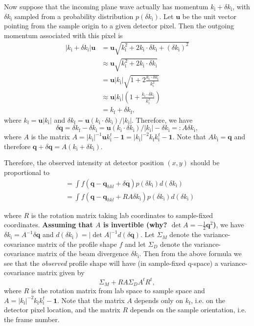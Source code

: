 \documentclass[11pt,a4paper]{article}
\def\v#1{\bm{{#1}}}
\def\si{\text{i}}
\def\sf{\text{f}}
\def\q{{\v{q}}}
\def\bu{\v{u}}
\begin{document}
Now suppose that the incoming plane wave actually has momentum $k_\si + \delta k_\si$, with $\delta k_\si$ sampled from a probability distribution $p(\delta k_\si)$. Let $\bu$ be the unit vector pointing from the sample origin to a given detector pixel. Then the outgoing momentum associated with this pixel is
\begin{align}
  |k_\si + \delta k_\si| \bu &= \bu \sqrt{k_\si^2  + 2 k_\si \cdot \delta k_\si + (\delta k_\si)^2 } \\
  &\approx \bu\sqrt{k_\si^2  + 2 k_\si \cdot \delta k_\si} \\
  &= \bu|k_\si|\sqrt{1+ 2\frac{k_\si \cdot \delta k_\si}{k_\si^2}} \\
  &\approx \bu|k_\si| \left(1 +  \frac{k_\si \cdot \delta k_\si}{k_\si^2}\right) \\
  &= k_\sf + \delta k_\sf,
\end{align}
where $k_\sf = \bu|k_\si|$ and $\delta k_\sf = \bu(k_\si \cdot \delta k_\si) / |k_\si|$. Therefore, we have
\begin{equation}
  \delta\q
  = \delta k_\sf - \delta k_\si = \bu(k_\si \cdot \delta k_\si) / |k_\si| - \delta k_\si
  =: A \delta k_\si,
\end{equation}
where $A$ is the matrix $A = |k_\si|^{-1} \bu k_\si^t - \v1 = |k_\si|^{-2} k_\sf k_\si^t - \v1$. Note that $A k_\si = \q$ and therefore
$\q + \delta \q = A(k_\si + \delta k_\si)$.

Therefore, the observed intensity at detector position $(x,y)$ should be proportional to
\begin{align}
  &= \int f(\q - \q_{hkl} + \delta \q) p(\delta k_\si) d(\delta k_\si) \\
  &= \int f(\q - \q_{hkl} + RA \delta k_\si) p(\delta k_\si) d(\delta k_\si)
\end{align}

where $R$ is the rotation matrix taking lab coordinates to sample-fixed coordinates.
\textbf{Assuming that $A$ is invertible (why? $\det A = -\frac{1}{2}\q^2$)}, we have $\delta k_\si = A^{-1} \delta \q$ and $d(\delta k_\si) = |\det A|^{-1} d(\delta \q)$. Let $\Sigma_M$ denote the variance-covariance matrix of the profile shape $f$ and let $\Sigma_D$ denote the variance-covariance matrix of the beam divergence $\delta k_\si$. Then from the above formula we see that the \emph{observed} profile shape will have (in sample-fixed q-space) a variance-covariance matrix given by
\begin{equation} \Sigma_M + R A \Sigma_D A^t R^t, \end{equation}
where $R$ is the rotation matrix from lab space to sample space and $A = |k_\si|^{-2} k_\sf k_\si^t - \v1$.
Note that the matrix $A$ depends only on $k_\sf$, i.e. on the detector pixel location, and the matrix $R$ depends on the sample orientation, i.e. the frame number.
\end{document}
